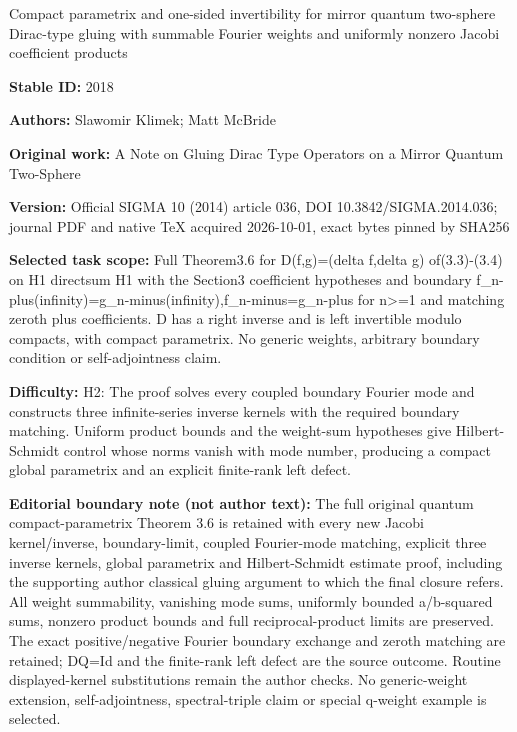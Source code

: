 \documentclass[11pt]{article}
\numberwithin{equation}{section}
\begin{document}
\begin{center}\Large Compact parametrix and one-sided invertibility for mirror quantum two-sphere Dirac-type gluing with summable Fourier weights and uniformly nonzero Jacobi coefficient products\end{center}
\noindent\textbf{Stable ID:} 2018\par
\noindent\textbf{Authors:} Slawomir Klimek; Matt McBride\par
\noindent\textbf{Original work:} A Note on Gluing Dirac Type Operators on a Mirror Quantum Two-Sphere\par
\noindent\textbf{Version:} Official SIGMA 10 (2014) article 036, DOI 10.3842/SIGMA.2014.036; journal PDF and native TeX acquired 2026-10-01, exact bytes pinned by SHA256\par
\noindent\textbf{Selected task scope:} Full Theorem3.6 for D(f,g)=\allowbreak{}(delta f,delta g) of(3.3)-(3.4) on H1 directsum H1 with the Section3 coefficient hypotheses and boundary f\_n-plus(infinity)=\allowbreak{}g\_n-minus(infinity),f\_n-minus=\allowbreak{}g\_n-plus for n>=\allowbreak{}1 and matching zeroth plus coefficients. D has a right inverse and is left invertible modulo compacts, with compact parametrix. No generic weights, arbitrary boundary condition or self-adjointness claim.\par
\noindent\textbf{Difficulty:} H2: The proof solves every coupled boundary Fourier mode and constructs three infinite-series inverse kernels with the required boundary matching. Uniform product bounds and the weight-sum hypotheses give Hilbert-Schmidt control whose norms vanish with mode number, producing a compact global parametrix and an explicit finite-rank left defect.\par
\noindent\textbf{Editorial boundary note (not author text):} The full original quantum compact-parametrix Theorem 3.6 is retained with every new Jacobi kernel/inverse, boundary-limit, coupled Fourier-mode matching, explicit three inverse kernels, global parametrix and Hilbert-Schmidt estimate proof, including the supporting author classical gluing argument to which the final closure refers. All weight summability, vanishing mode sums, uniformly bounded a/b-squared sums, nonzero product bounds and full reciprocal-product limits are preserved. The exact positive/negative Fourier boundary exchange and zeroth matching are retained; DQ=\allowbreak{}Id and the finite-rank left defect are the source outcome. Routine displayed-kernel substitutions remain the author checks. No generic-weight extension, self-adjointness, spectral-triple claim or special q-weight example is selected.\par
\end{document}
